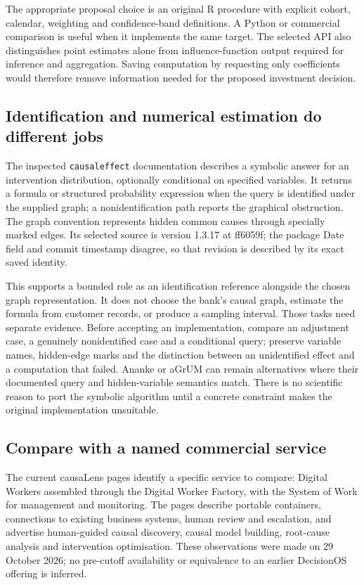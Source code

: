 The appropriate proposal choice is an original R procedure with explicit
cohort, calendar, weighting and confidence-band definitions. A Python or
commercial comparison is useful when it implements the same target. The
selected API also distinguishes point estimates alone from influence-function
output required for inference and aggregation. Saving computation by requesting
only coefficients would therefore remove information needed for the proposed
investment decision. \citep{survey29didapi}

\subsection{Identification and numerical estimation do different jobs}
The inspected \texttt{causaleffect} documentation describes a symbolic answer
for an intervention distribution, optionally conditional on specified variables.
It returns a formula or structured probability expression when the query is
identified under the supplied graph; a nonidentification path reports the
graphical obstruction. The graph convention represents hidden common causes
through specially marked edges. Its selected source is version 1.3.17 at
ff6059f; the package Date field and commit timestamp disagree, so that
revision is described by its exact saved identity. \citep{exec18_rid_causaleffect}

This supports a bounded role as an identification reference alongside the
chosen graph representation. It does not choose the bank's causal graph,
estimate the formula from customer records, or produce a sampling interval.
Those tasks need separate evidence. Before accepting an implementation, compare
an adjustment case, a genuinely nonidentified case and a conditional query;
preserve variable names, hidden-edge marks and the distinction between an
unidentified effect and a computation that failed. Ananke or aGrUM can remain
alternatives where their documented query and hidden-variable semantics match.
There is no scientific reason to port the symbolic algorithm until a concrete
constraint makes the original implementation unsuitable.

\subsection{Compare with a named commercial service}
The current causaLens pages identify a specific service to compare: Digital
Workers assembled through the Digital Worker Factory, with the System of Work
for management and monitoring. The pages describe portable containers,
connections to existing business systems, human review and escalation, and
advertise human-guided causal discovery, causal model building, root-cause
analysis and intervention optimisation. These observations were made on
29 October 2026; no pre-cutoff availability or equivalence to an earlier
DecisionOS offering is inferred. \citep{survey29causalens}

